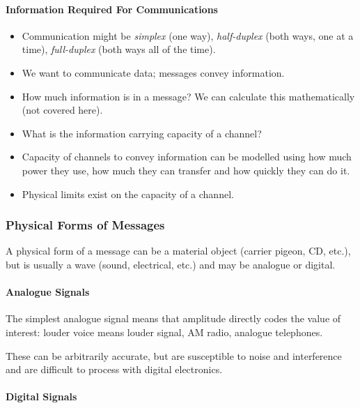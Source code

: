 \paragraph{Information Required For Communications}\label{par:information_required_for_communications}

\begin{itemize}
    \item Communication might be \emph{simplex} (one way), \emph{half-duplex} (both ways, one at a time), \emph{full-duplex} (both ways all of the time).
    \item We want to communicate data; messages convey information.
    \item How much information is in a message? We can calculate this mathematically (not covered here).
    \item What is the information carrying capacity of a channel?
    \item Capacity of channels to convey information can be modelled using how much power they use, how much they can transfer and how quickly they can do it.
    \item Physical limits exist on the capacity of a channel.
\end{itemize}

\subsubsection{Physical Forms of Messages}\label{ssub:physical_forms_of_messages}

A physical form of a message can be a material object (carrier pigeon, CD, etc.), but is usually a wave (sound, electrical, etc.) and may be analogue or digital.

\paragraph{Analogue Signals}\label{par:analogue_signals}

The simplest analogue signal means that amplitude directly codes the value of interest: louder voice means louder signal, AM radio, analogue telephones.

These can be arbitrarily accurate, but are susceptible to noise and interference and are difficult to process with digital electronics.

\paragraph{Digital Signals}\label{par:digital_signals}

